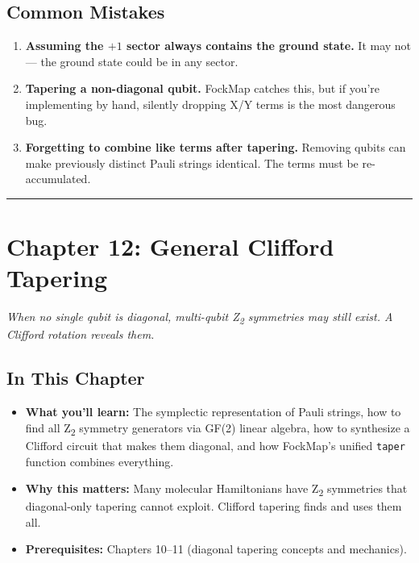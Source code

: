 \documentclass[
  11pt,
  oneside]{book}
\providecommand{\tightlist}{%
  \setlength{\itemsep}{0pt}\setlength{\parskip}{0pt}}
\begin{document}
\section{Common Mistakes}\label{common-mistakes-9}

\begin{enumerate}
\def\labelenumi{\arabic{enumi}.}
\item
  \textbf{Assuming the \(+1\) sector always contains the ground state.}
  It may not --- the ground state could be in any sector.
\item
  \textbf{Tapering a non-diagonal qubit.} FockMap catches this, but if
  you're implementing by hand, silently dropping X/Y terms is the most
  dangerous bug.
\item
  \textbf{Forgetting to combine like terms after tapering.} Removing
  qubits can make previously distinct Pauli strings identical. The terms
  must be re-accumulated.
\end{enumerate}

\begin{center}\rule{0.5\linewidth}{0.5pt}\end{center}

\chapter{Chapter 12: General Clifford
Tapering}\label{chapter-12-general-clifford-tapering}

\emph{When no single qubit is diagonal, multi-qubit Z\textsubscript{2} symmetries may
still exist. A Clifford rotation reveals them.}

\section{In This Chapter}\label{in-this-chapter-11}

\begin{itemize}
\tightlist
\item
  \textbf{What you'll learn:} The symplectic representation of Pauli
  strings, how to find all Z\textsubscript{2} symmetry generators via GF(2) linear
  algebra, how to synthesize a Clifford circuit that makes them
  diagonal, and how FockMap's unified \texttt{taper} function combines
  everything.
\item
  \textbf{Why this matters:} Many molecular Hamiltonians have Z\textsubscript{2}
  symmetries that diagonal-only tapering cannot exploit. Clifford
  tapering finds and uses them all.
\item
  \textbf{Prerequisites:} Chapters 10--11 (diagonal tapering concepts
  and mechanics).
\end{itemize}
\end{document}
